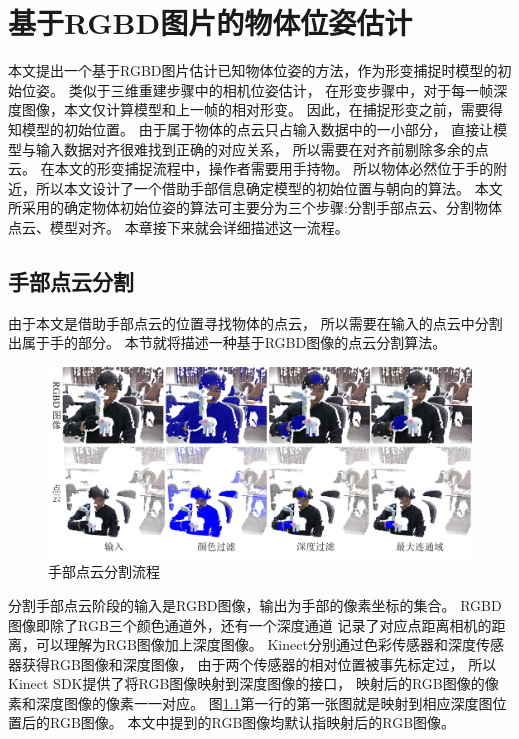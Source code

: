 \chapter{基于RGBD图片的物体位姿估计}


 本文提出一个基于RGBD图片估计已知物体位姿的方法，作为形变捕捉时模型的初始位姿。
 类似于三维重建步骤中的相机位姿估计，
 在形变步骤中，对于每一帧深度图像，本文仅计算模型和上一帧的相对形变。
 因此，在捕捉形变之前，需要得知模型的初始位置。
 由于属于物体的点云只占输入数据中的一小部分，
 直接让模型与输入数据对齐很难找到正确的对应关系，
 所以需要在对齐前剔除多余的点云。
 在本文的形变捕捉流程中，操作者需要用手持物。
 所以物体必然位于手的附近，所以本文设计了一个借助手部信息确定模型的初始位置与朝向的算法。
 本文所采用的确定物体初始位姿的算法可主要分为三个步骤:分割手部点云、分割物体点云、模型对齐。
 本章接下来就会详细描述这一流程。

\section{手部点云分割}
由于本文是借助手部点云的位置寻找物体的点云，
所以需要在输入的点云中分割出属于手的部分。
本节就将描述一种基于RGBD图像的点云分割算法。
\begin{figure}[h]
    \centering
    \includegraphics[width = \textwidth]{./Pictures/FindingHand.png}
    \caption{手部点云分割流程}
    \label{finding_hand}
\end{figure}
分割手部点云阶段的输入是RGBD图像，输出为手部的像素坐标的集合。
RGBD图像即除了RGB三个颜色通道外，还有一个深度通道
记录了对应点距离相机的距离，可以理解为RGB图像加上深度图像。
Kinect分别通过色彩传感器和深度传感器获得RGB图像和深度图像，
由于两个传感器的相对位置被事先标定过，
所以Kinect SDK提供了将RGB图像映射到深度图像的接口，
映射后的RGB图像的像素和深度图像的像素一一对应。
图\ref{finding_hand}第一行的第一张图就是映射到相应深度图位置后的RGB图像。
本文中提到的RGB图像均默认指映射后的RGB图像。

